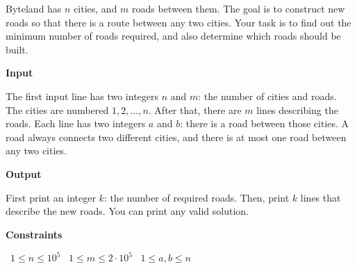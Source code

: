 Byteland has $n$ cities, and $m$ roads between them. The goal is to construct new roads so that there is a route between any two cities.
Your task is to find out the minimum number of roads required, and also determine which roads should be built.

\vspace{0.3cm}\noindent\textbf{Input}

The first input line has two integers $n$ and $m$: the number of cities and roads. The cities are numbered $1,2,\dots,n$.
After that, there are $m$ lines describing the roads. Each line has two integers $a$ and $b$: there is a road between those cities.
A road always connects two different cities, and there is at most one road between any two cities.

\vspace{0.3cm}\noindent\textbf{Output}

First print an integer $k$: the number of required roads.
Then, print $k$ lines that describe the new roads. You can print any valid solution.

\vspace{0.3cm}\noindent\textbf{Constraints}

\textbullet\ $1 \le n \le 10^5$
\textbullet\ $1 \le m \le 2 \cdot 10^5$
\textbullet\ $1 \le a,b \le n$